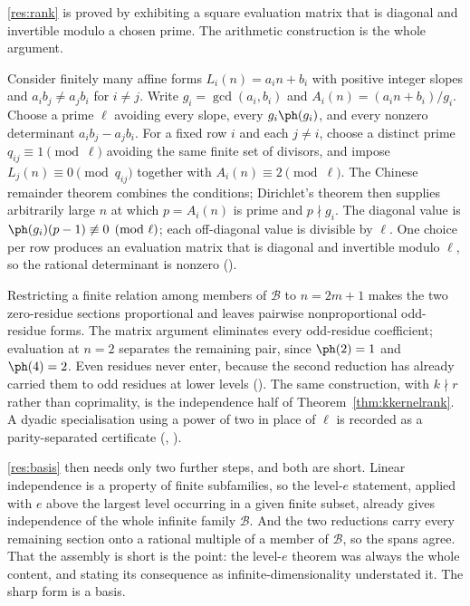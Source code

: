 \ref{res:rank} is proved by exhibiting a square evaluation matrix that is diagonal and invertible modulo a chosen prime.  The arithmetic construction is the whole argument.

Consider finitely many affine forms $L_i(n)=a_in+b_i$ with positive integer slopes and $a_ib_j\neq a_jb_i$ for $i\neq j$.  Write $g_i=\gcd(a_i,b_i)$ and $A_i(n)=(a_in+b_i)/g_i$.  Choose a prime $\ell$ avoiding every slope, every $g_i\ph(g_i)$, and every nonzero determinant $a_ib_j-a_jb_i$.  For a fixed row $i$ and each $j\neq i$, choose a distinct prime $q_{ij}\equiv1\pmod{\ell}$ avoiding the same finite set of divisors, and impose $L_j(n)\equiv0\pmod{q_{ij}}$ together with $A_i(n)\equiv2\pmod{\ell}$.  The Chinese remainder theorem combines the conditions; Dirichlet's theorem then supplies arbitrarily large $n$ at which $p=A_i(n)$ is prime and $p\nmid g_i$.  The diagonal value is $\ph(g_i)(p-1)\not\equiv0\pmod{\ell}$; each off-diagonal value is divisible by $\ell$.  One choice per row produces an evaluation matrix that is diagonal and invertible modulo $\ell$, so the rational determinant is nonzero
().

Restricting a finite relation among members of $\mathcal B$ to $n=2m+1$ makes the two zero-residue sections proportional and leaves pairwise nonproportional odd-residue forms.  The matrix argument eliminates every odd-residue coefficient; evaluation at $n=2$ separates the remaining pair, since $\ph(2)=1$ and $\ph(4)=2$.  Even residues never enter, because the second reduction has already carried them to odd residues at lower levels
().  The same construction, with $k\nmid r$ rather than coprimality, is the independence half of Theorem~\ref{thm:kkernelrank}.  A dyadic specialisation using a power of two in place of $\ell$ is recorded as a parity-separated certificate
(,
).

\ref{res:basis} then needs only two further steps, and both are short.  Linear
independence is a property of finite subfamilies, so the level-$e$ statement,
applied with $e$ above the largest level occurring in a given finite subset,
already gives independence of the whole infinite family $\mathcal B$.  And
the two reductions carry every remaining section onto a rational multiple of a
member of $\mathcal B$, so the spans agree.  That the assembly is short is the
point: the level-$e$ theorem was always the whole content, and stating its
consequence as infinite-dimensionality understated it.  The sharp form is a
basis.

